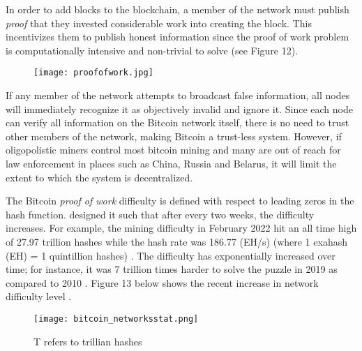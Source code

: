 \documentclass[12pt]{article}
\newcommand{\1}{\mathbbm 1}
\begin{document}
		
		
		
		In order to add blocks to the blockchain, a member of the network must publish \textit{proof} that they invested considerable work into creating the block. This incentivizes them to publish honest information since the proof of work problem is computationally intensive and non-trivial to solve (see Figure 12).
		
		
		\begin{figure}[H]
			\begin{Center}
				\texttt{[image: proofofwork.jpg]}		
				\caption{}
			\end{Center}
		\end{figure}
		
		
		
		If any member of the network attempts to broadcast false information, all nodes will immediately recognize it as objectively invalid and ignore it. Since each node can verify all information on the Bitcoin network itself, there is no need to trust other members of the network, making Bitcoin a trust-less system. However, if oligopolistic miners control most bitcoin mining \cite{roubini2018blockchain} and many are out of reach for law enforcement in places such as China, Russia and Belarus, it will limit the extent to which the system is decentralized.
		
		
		
		The Bitcoin \textit{proof of work} difficulty is defined with respect to leading zeros in the hash function. \cite{nakamoto2008bitcoin} designed it such that after every two weeks, the difficulty increases. For example, the mining difficulty in February 2022 hit an all time high of 27.97 trillion hashes while the hash rate was 186.77 (EH/s) (where 1 exahash (EH) = 1 quintillion hashes) \cite{vaca2022}. The difficulty has exponentially increased over time; for instance, it was 7 trillion times harder to solve the puzzle in 2019 as compared to 2010 \cite{hacioglu2020digital}. Figure 13 below shows the recent increase in network difficulty level \cite{vaca2022}.
		
		
		
		
		
		
		
		
		
		
		
		
		\begin{figure}[H]
			\begin{Center}
				\texttt{[image: bitcoin\_networksstat.png]}		
				\caption{T refers to trillian hashes}
			\end{Center}
		\end{figure}
		
\end{document}
